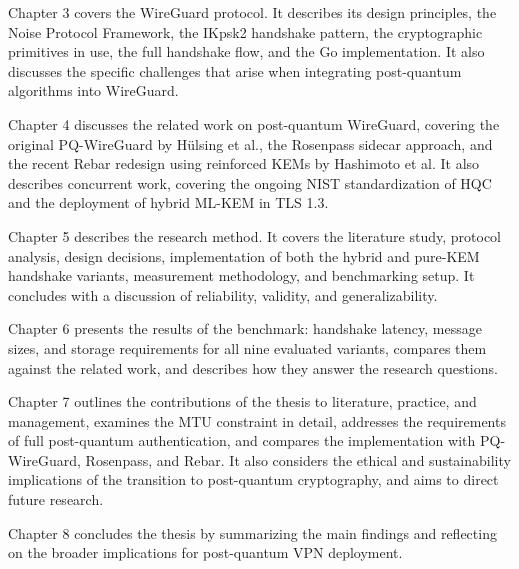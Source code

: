 Chapter 3 covers the WireGuard protocol. It describes its design principles, the Noise Protocol Framework, the IKpsk2 handshake pattern, the cryptographic primitives in use, the full handshake flow, and the Go implementation. It also discusses the specific challenges that arise when integrating post-quantum algorithms into WireGuard. 

Chapter 4 discusses the related work on post-quantum WireGuard, covering the original PQ-WireGuard by Hülsing et al., the Rosenpass sidecar approach, and the recent Rebar redesign using reinforced KEMs by Hashimoto et al. It also describes concurrent work, covering the ongoing NIST standardization of HQC and the deployment of hybrid ML-KEM in TLS 1.3.

Chapter 5 describes the research method. It covers the literature study, protocol analysis, design decisions, implementation of both the hybrid and pure-KEM handshake variants, measurement methodology, and benchmarking setup. It concludes with a discussion of reliability, validity, and generalizability. 

Chapter 6 presents the results of the benchmark: handshake latency, message sizes, and storage requirements for all nine evaluated variants, compares them against the related work, and describes how they answer the research questions. 

Chapter 7 outlines the contributions of the thesis to literature, practice, and management, examines the MTU constraint in detail, addresses the requirements of full post-quantum authentication, and compares the implementation with PQ-WireGuard, Rosenpass, and Rebar. It also considers the ethical and sustainability implications of the transition to post-quantum cryptography, and aims to direct future research.

Chapter 8 concludes the thesis by summarizing the main findings and reflecting on the broader implications for post-quantum VPN deployment.